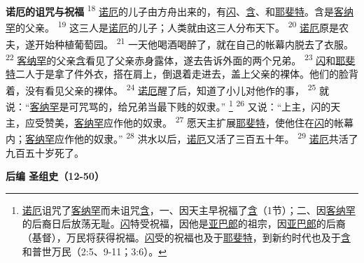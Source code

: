 \textbf{诺厄的诅咒与祝福 }
\textsuperscript{18}
\uline{诺厄}的儿子由方舟出来的，有\uline{闪}、\uline{含}、和\uline{耶斐特}。含是\uline{客纳罕}的父亲。
\textsuperscript{19}
这三人是\uline{诺厄}的儿子；人类就由这三人分布天下。
\textsuperscript{20}
\uline{诺厄}原是农夫，遂开始种植葡萄园。
\textsuperscript{21}
一天他喝酒喝醉了，就在自己的帐幕内脱去了衣服。
\textsuperscript{22}
\uline{客纳罕}的父亲\uline{含}看见了父亲赤身露体，遂去告诉外面的两个兄弟。
\textsuperscript{23}
\uline{闪}和\uline{耶斐特}二人于是拿了件外衣，搭在肩上，倒退着走进去，盖上父亲的裸体。他们的脸背着，没有看见父亲的裸体。
\textsuperscript{24}
\uline{诺厄}醒了后，知道了小儿对他作的事，
\textsuperscript{25}
就说：“\uline{客纳罕}是可咒骂的，给兄弟当最下贱的奴隶。”
\footnote{\uline{诺厄}诅咒了\uline{客纳罕}而未诅咒\uline{含}，一、因天主早祝福了\uline{含}（1节）；二、因\uline{客纳罕}的后裔日后放荡无耻。\uline{闪}特受祝福，因他是\uline{亚巴郎}的祖宗，因\uline{亚巴郎}的后裔（基督），万民将获得祝福。\uline{闪}受的祝福也及于\uline{耶斐特}，到新约时代也及于\uline{含}和普世万民（2:5、9-11；3:6）。}
\textsuperscript{26}
又说：“上主，闪的天主，应受赞美，\uline{客纳罕}应作他的奴隶。
\textsuperscript{27}
愿天主扩展\uline{耶斐特}，使他住在\uline{闪}的帐幕内；\uline{客纳罕}应作他的奴隶。”
\textsuperscript{28}
洪水以后，\uline{诺厄}又活了三百五十年。
\textsuperscript{29}
\uline{诺厄}共活了九百五十岁死了。

\begin{center}
	\textbf{后编 圣组史（12-50）}
\end{center}